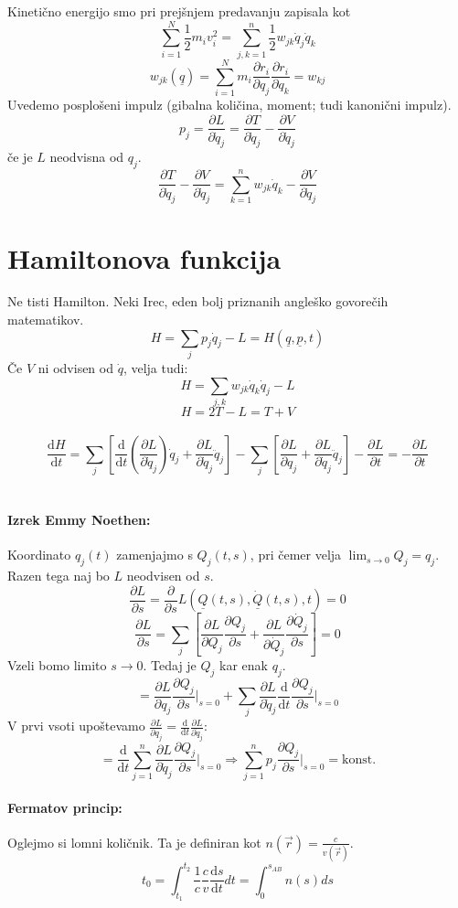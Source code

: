 \documentclass[a4paper]{article}
\newcommand{\vct}[1]{\overrightarrow{#1}}
\newcommand{\pd}[2]{\frac{\partial {#1}}{\partial {#2}}}
\newcommand{\dd}[2]{\frac{\mathrm{d} {#1}}{\mathrm{d} {#2}}}
\begin{document}
Kinetično energijo smo pri prejšnjem predavanju zapisala kot $$\sum_{i=1}^{N}\frac{1}{2}m_iv_i^2 = \sum_{j, k = 1}^{n}\frac{1}{2}w_{jk}\dot{q}_j\dot{q}_k$$
$$w_{jk}(\underline{q}) = \sum_{i=1}^{N} m_i\pd{r_i}{q_j}\pd{r_i}{q_k} = w_{kj}$$
Uvedemo posplošeni impulz (gibalna količina, moment; tudi kanonični impulz).
$$p_j = \pd{L}{\dot{q}_j} = \pd{T}{\dot{q}_j} - \pd{V}{\dot{q}_j}$$
če je $L$ neodvisna od $q_j$.
$$\pd{T}{\dot{q}_j} - \pd{V}{\dot{q}_j} = \sum_{k=1}^{n}w_{jk}\dot{q}_k - \pd{V}{\dot{q}_j}$$
\section{Hamiltonova funkcija}
Ne tisti Hamilton. Neki Irec, eden bolj priznanih angleško govorečih matematikov.
$$H = \sum_{j}p_j\dot{q}_j - L = H(\underline{q}, \underline{p}, t)$$
Če $V$ ni odvisen od $\dot{q}$, velja tudi:
$$H = \sum_{j,k}w_{jk}\dot{q}_k\dot{q}_j - L$$
$$H = 2T - L = T + V$$
\\
$$\dd{H}{t} = \sum_{j}\left[\dd{}{t}\left(\pd{L}{\dot{q}_j}\right)\dot{q}_j + \pd{L}{\dot{q}_j}\ddot{q}_j\right] - \sum_{j}\left[\pd{L}{q_j} + \pd{L}{\dot{q}_j}\ddot{q}_j\right] - \pd{L}{t} = -\pd{L}{t}$$
\\
\paragraph{Izrek Emmy Noethen:} Koordinato $q_j(t)$ zamenjajmo s $Q_j(t, s)$, pri čemer velja $\displaystyle{\lim_{s\to 0}Q_j = q_j}$.
Razen tega naj bo $L$ neodvisen od $s$.
$$\pd{L}{s} = \pd{}{s}L\left(\underline{Q}(t, s), \underline{\dot{Q}}(t, s), t\right) = 0$$
$$\pd{L}{s} = \sum_{j}\left[\pd{L}{Q_j}\pd{Q_j}{s} + \pd{L}{\dot{Q}_j}\pd{\dot{Q}_j}{s}\right] = 0$$
Vzeli bomo limito $s \to 0$. Tedaj je $Q_j$ kar enak $q_j$.
$$= \pd{L}{q_j}\pd{Q_j}{s}\Big|_{s=0} + \sum_{j}\pd{L}{\dot{q}_j}\dd{}{t}\pd{Q_j}{s}\Big|_{s=0}$$
V prvi vsoti upoštevamo $\displaystyle{\pd{L}{q_j} = \dd{}{t}\pd{L}{\dot{q}_j}}$:
$$= \dd{}{t}\sum_{j=1}^{n}\pd{L}{\dot{q}_j}\pd{Q_j}{s} \Big|_{s=0} \Rightarrow \sum_{j=1}^{n}p_j\pd{Q_j}{s}\Big|_{s=0} = \text{konst.}$$
\paragraph{Fermatov princip:} Oglejmo si lomni količnik. Ta je definiran kot $\displaystyle{n(\vct{r}) = \frac{c}{v(\vct{r})}}$.
$$t_0 = \int_{t_1}^{t_2}\frac{1}{c}\frac{c}{v}\dd{s}{t}dt = \int_{0}^{s_{AB}}n(s)ds$$
\end{document}

